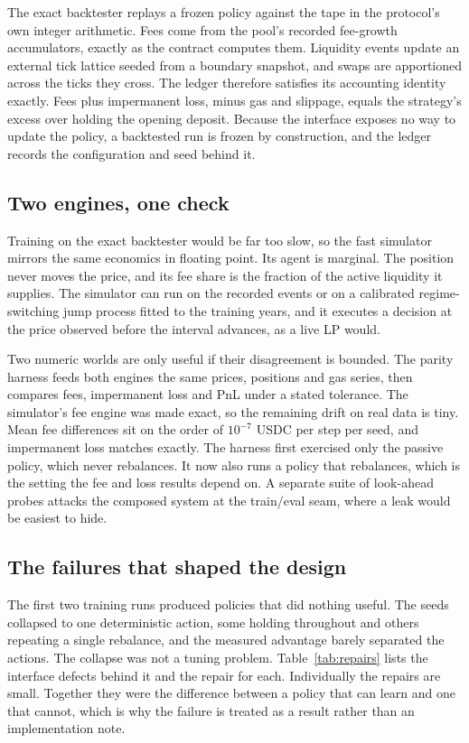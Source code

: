 The exact backtester replays a frozen policy against the tape in the protocol's
own integer arithmetic. Fees come from the pool's recorded fee-growth
accumulators, exactly as the contract computes them. Liquidity events update an
external tick lattice seeded from a boundary snapshot, and swaps are
apportioned across the ticks they cross. The ledger therefore satisfies its
accounting identity exactly. Fees plus impermanent loss, minus gas and
slippage, equals the strategy's excess over holding the opening deposit.
Because the interface exposes no way to update the policy, a backtested run is
frozen by construction, and the ledger records the configuration and seed
behind it.

\subsection{Two engines, one check}

Training on the exact backtester would be far too slow, so the fast simulator
mirrors the same economics in floating point. Its agent is marginal. The
position never moves the price, and its fee share is the fraction of the active
liquidity it supplies. The simulator can run on the recorded events or on a
calibrated regime-switching jump process fitted to the training years, and it
executes a decision at the price observed before the interval advances, as a
live LP would.

Two numeric worlds are only useful if their disagreement is bounded. The parity
harness feeds both engines the same prices, positions and gas series, then
compares fees, impermanent loss and PnL under a stated tolerance. The
simulator's fee engine was made exact, so the remaining drift on real data is
tiny. Mean fee differences sit on the order of $10^{-7}$ USDC per step per
seed, and impermanent loss matches exactly. The harness first exercised only
the passive policy, which never rebalances. It now also runs a policy that
rebalances, which is the setting the fee and loss results depend on. A separate suite of
look-ahead probes attacks the composed system at the train/eval seam, where a
leak would be easiest to hide.

\subsection{The failures that shaped the design}

The first two training runs produced policies that did nothing useful. The
seeds collapsed to one deterministic action, some holding throughout and others
repeating a single rebalance, and the measured advantage barely separated the
actions. The collapse was not a tuning problem. Table~\ref{tab:repairs} lists
the interface defects behind it and the repair for each. Individually the
repairs are small. Together they were the difference between a policy that can
learn and one that cannot, which is why the failure is treated as a result
rather than an implementation note.

